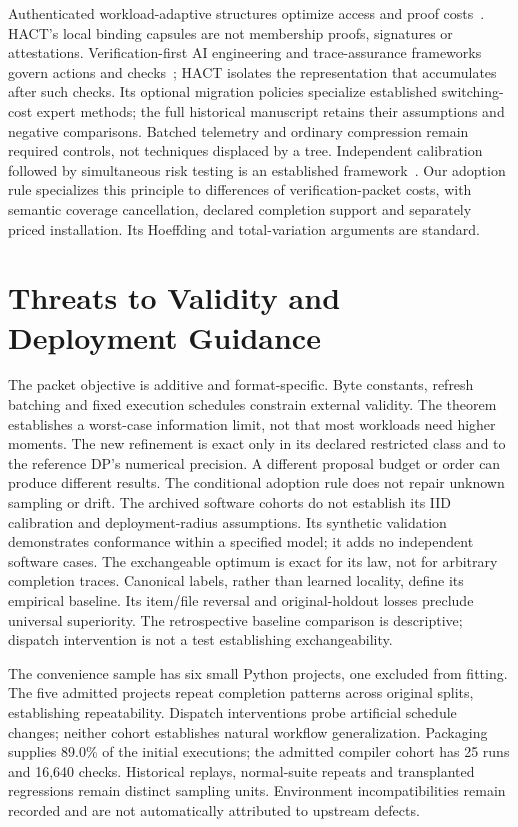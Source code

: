 \documentclass[preprint,12pt]{elsarticle}
\theoremstyle{definition}\newtheorem{definition}[theorem]{Definition}
\begin{document}
Authenticated workload-adaptive structures optimize access and proof
costs~\cite{hmt}. HACT's local binding capsules are not membership proofs,
signatures or attestations. Verification-first AI engineering and
trace-assurance frameworks govern actions and checks~\cite{aiware,traceassurance};
HACT isolates the representation that accumulates after such checks.
Its optional migration policies specialize established switching-cost expert
methods; the full historical manuscript retains their assumptions and
negative comparisons. Batched telemetry and ordinary compression remain
required controls, not techniques displaced by a tree.
Independent calibration followed by simultaneous risk testing is an
established framework~\cite{learntest}. Our adoption rule specializes this
principle to differences of verification-packet costs, with semantic
coverage cancellation, declared completion support and separately priced
installation. Its Hoeffding and total-variation arguments are standard.

\section{Threats to Validity and Deployment Guidance}
The packet objective is additive and format-specific. Byte constants,
refresh batching and fixed execution schedules constrain external validity.
The theorem establishes a worst-case information limit, not that most
workloads need higher moments. The new refinement is exact only in its
declared restricted class and to the reference DP's numerical precision.
A different proposal budget or order can produce different results.
The conditional adoption rule does not repair unknown sampling or drift.
The archived software cohorts do not establish its IID calibration and
deployment-radius assumptions. Its synthetic validation demonstrates
conformance within a specified model; it adds no independent software cases.
The exchangeable optimum is exact for its law, not for arbitrary completion
traces. Canonical labels, rather than learned locality, define its empirical
baseline. Its item/file reversal and original-holdout losses preclude
universal superiority. The retrospective baseline comparison is descriptive;
dispatch intervention is not a test establishing exchangeability.

The convenience sample has six small Python projects, one excluded from
fitting. The five admitted projects repeat completion patterns across
original splits, establishing repeatability. Dispatch interventions probe
artificial schedule changes; neither cohort establishes natural workflow
generalization. Packaging supplies 89.0\% of the initial executions;
the admitted compiler cohort has 25 runs and 16,640 checks. Historical
replays, normal-suite repeats and transplanted regressions remain distinct
sampling units. Environment incompatibilities remain recorded and are not
automatically attributed to upstream defects.
\end{document}

